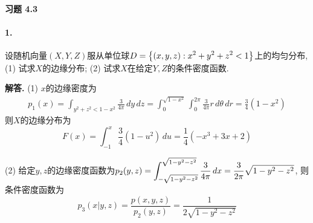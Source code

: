 \documentclass[12pt, a4paper, oneside]{ctexart}
\newenvironment{solution}{\par\noindent\textbf{解答. }}{\bigskip\par}
\begin{document}
\paragraph{习题 4.3}
\paragraph{1.}设随机向量$(X,Y,Z)$服从单位球$\displaystyle D = \left\{(x, y, z):x^2+y^2+z^2 < 1\right\}$上的均匀分布, (1) 试求$X$的边缘分布; (2) 试求$X$在给定$Y,Z$的条件密度函数.
\begin{solution}
    (1) $x$的边缘密度为
    \begin{equation*}
        \begin{aligned}
            p_1(x) = \int_{y^2+z^2 < 1-x^2}\frac{3}{4\pi}\, dy\,dz = \int_0^{\sqrt{1-x^2}}\int_0^{2\pi}\frac{3}{4\pi}r\,d\theta\,dr=\frac{3}{4}(1-x^2)
        \end{aligned}
    \end{equation*}
    则$X$的边缘分布为
    \begin{equation*}
        F(x) = \int_{-1}^x\frac{3}{4}(1-u^2)\,du = \frac{1}{4}(-x^3+3x+2)
    \end{equation*}

    (2) 给定$y,z$的边缘密度函数为$\displaystyle p_2(y, z) = \int_{-\sqrt{1-y^2-z^2}}^{\sqrt{1-y^2-z^2}}\frac{3}{4\pi}\,dx = \frac{3}{2\pi}\sqrt{1-y^2-z^2}$, 则条件密度函数为
    \begin{equation*}
        p_3(x|y, z) = \frac{p(x, y, z)}{p_2(y, z)} = \frac{1}{2\sqrt{1-y^2-z^2}}
    \end{equation*}
\end{solution}
\end{document}
